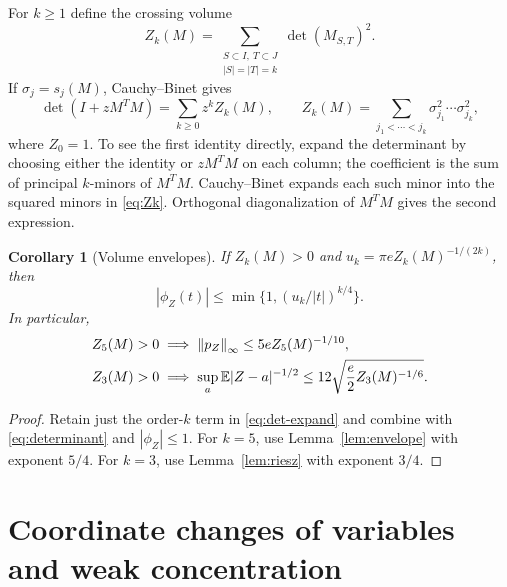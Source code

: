 \documentclass[11pt]{article}
\numberwithin{equation}{section}
\newtheorem{corollary}[theorem]{Corollary}
\theoremstyle{definition}\newtheorem{definition}[theorem]{Definition}
\theoremstyle{remark}\newtheorem{remark}[theorem]{Remark}
\newcommand{\1}{\mathbf 1}\newcommand{\diag}{\operatorname{diag}}
\newcommand{\norm}[1]{\left\lVert#1\right\rVert}\newcommand{\abs}[1]{\left|#1\right|}
\begin{document}
For $k\ge1$ define the crossing volume
\begin{equation}\label{eq:Zk}
 Z_k(M)=\sum_{\substack{S\subset I,\ T\subset J\\|S|=|T|=k}}\det(M_{S,T})^2.
\end{equation}
If $\sigma_j=s_j(M)$, Cauchy--Binet gives
\begin{equation}\label{eq:det-expand}
 \det(I+zM^TM)=\sum_{k\ge0}z^k Z_k(M),\qquad
 Z_k(M)=\sum_{j_1<\cdots<j_k}\sigma_{j_1}^2\cdots\sigma_{j_k}^2,
\end{equation}
where $Z_0=1$. To see the first identity directly, expand the determinant by choosing either the identity or $zM^TM$ on each column; the coefficient is the sum of principal $k$-minors of $M^TM$. Cauchy--Binet expands each such minor into the squared minors in \eqref{eq:Zk}. Orthogonal diagonalization of $M^TM$ gives the second expression.

\begin{corollary}[Volume envelopes]\label{cor:vol-fourier}
If $Z_k(M)>0$ and $u_k=\pi e Z_k(M)^{-1/(2k)}$, then
\begin{equation}\label{eq:vol-envelope}
 |\phi_Z(t)|\le\min\{1,(u_k/|t|)^{k/4}\}.
\end{equation}
In particular,
\begin{align}
 Z_5(M)>0&\implies \norm{p_Z}_\infty\le5e Z_5(M)^{-1/10},\label{eq:five-volume}\\
 Z_3(M)>0&\implies \sup_a\E|Z-a|^{-1/2}
 \le12\sqrt{\frac e2 Z_3(M)^{-1/6}}.\label{eq:three-volume}
\end{align}
\end{corollary}
\begin{proof}
Retain just the order-$k$ term in \eqref{eq:det-expand} and combine with \eqref{eq:determinant} and $|\phi_Z|\le1$. For $k=5$, use Lemma~\ref{lem:envelope} with exponent $5/4$. For $k=3$, use Lemma~\ref{lem:riesz} with exponent $3/4$.
\end{proof}

\section{Coordinate changes of variables and weak concentration}\label{sec:pivots}
\end{document}
